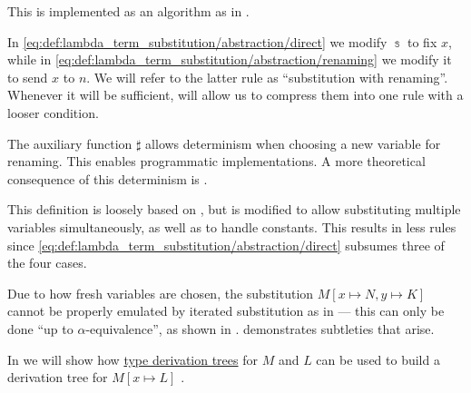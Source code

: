 \begin{comments}
  \item This is implemented as an algorithm as  in \cite{notebook:code}.

  \item In \eqref{eq:def:lambda_term_substitution/abstraction/direct} we modify \( \Bbbs \) to fix \( x \), while in \eqref{eq:def:lambda_term_substitution/abstraction/renaming} we modify it to send \( x \) to \( n \). We will refer to the latter rule as \enquote{substitution with renaming}. Whenever it will be sufficient,  will allow us to compress them into one rule with a looser condition.

  \item The auxiliary function \( \sharp \) allows determinism when choosing a new variable for renaming. This enables programmatic implementations. A more theoretical consequence of this determinism is .

  \item This definition is loosely based on \cite[def. 1A7]{Hindley1997BasicSTT}, but is modified to allow substituting multiple variables simultaneously, as well as to handle constants. This results in less rules since \eqref{eq:def:lambda_term_substitution/abstraction/direct} subsumes three of the four cases.

  \item Due to how fresh variables are chosen, the substitution \( M[x \mapsto N, y \mapsto K] \) cannot be properly emulated by iterated substitution as in  --- this can only be done \enquote{up to \( \alpha \)-equivalence}, as shown in .  demonstrates subtleties that arise.

  \item In  we will show how \hyperref[def:type_derivation_tree]{type derivation trees} for \( M \) and \( L \) can be used to build a derivation tree for \( M[x \mapsto L] \) .
\end{comments}

